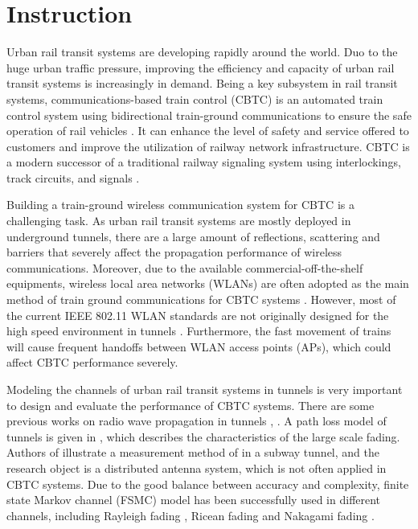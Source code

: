 \documentclass[conference]{IEEEtran}
\begin{document}
\IEEEpeerreviewmaketitle





\section{Instruction}
Urban rail transit systems are developing rapidly around the world. Duo to the huge urban traffic pressure, improving the efficiency and capacity of urban rail transit systems is increasingly in demand. Being a key subsystem in rail transit systems, communications-based train control (CBTC) is an automated train control system using  bidirectional train-ground communications to ensure the safe operation of rail vehicles \cite{What_is_communication-based_train_control}. It can enhance the level of safety and service offered to customers and improve the utilization of railway network infrastructure. CBTC is a modern successor of a traditional railway signaling system using interlockings, track circuits, and signals \cite{CBTC_Standard}.



Building a train-ground wireless communication system for CBTC is a challenging task. As urban rail transit systems are mostly deployed in underground tunnels, there are a large amount of reflections, scattering and barriers that  severely affect the propagation performance of wireless communications. Moreover, due to the available commercial-off-the-shelf equipments, wireless local area networks (WLANs) are often adopted as the main method of train ground communications for CBTC systems \cite{ZHULI_FSMC}. However, most of the current IEEE 802.11 WLAN standards are not originally designed for the high speed environment in tunnels \cite{ZHULI_FSMC,ZFBT12}. Furthermore, the fast movement of trains will cause frequent handoffs between WLAN access points (APs), which could affect CBTC performance severely.

Modeling the channels of urban rail transit systems in tunnels is very important to design and evaluate the performance of CBTC systems. There are some previous works  on radio wave propagation in tunnels \cite{ZHANGYP_Enhancement_of_rectangular_tunnel_waveguide_model}, \cite{ZhangYP_Novel_Model}. A path loss model of tunnels is given in \cite{ZhangYP_Novel_Model}, which describes the characteristics of the large scale fading. Authors of \cite{KEGUAN} illustrate a measurement method of  in a subway tunnel, and the research object is a distributed antenna system, which is not often applied in CBTC systems. Due to the good balance between accuracy and complexity, finite state Markov channel (FSMC) model has been successfully used in different channels, including Rayleigh fading \cite{Finite_state_Markov_channel_a_useful_model_for_radio_communication_channels}, Ricean fading  \cite{Finite-state_Markov_modeling_of_correlated_Rician-fading_channels} and Nakagami fading \cite{Fast_simulation_of_diversity_Nakagami_fading_channels_using_finite-state_Markov_models}.
\end{document}
